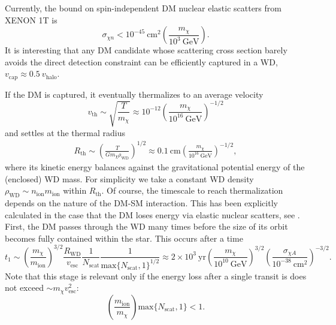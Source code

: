 \documentclass[preprintnumbers,amsmath,amssymb,prd,superscriptaddress]{revtex4}
\newcommand{\GeV}{\text{GeV}}
\newcommand{\cm}{\text{cm}}
\def\r{\right)}
\def\l{\left(}
\begin{document}
Currently, the bound on spin-independent DM nuclear elastic scatters from XENON 1T is
\begin{equation}
\label{eq:xenon}
\sigma_{\chi n} < 10^{-45} ~\text{cm}^2 \l \frac{m_\chi}{10^3 ~\GeV} \r.
\end{equation}
It is interesting that any DM candidate whose scattering cross section barely avoids the direct detection constraint can be efficiently captured in a WD, $v_\text{cap} \approx 0.5 ~v_\text{halo}$. 

If the DM is captured, it eventually thermalizes to an average velocity
\begin{equation}
v_\text{th} \sim \sqrt{\frac{T}{m_\chi}} \approx 10^{-12} \l \frac{m_\chi}{10^{16} ~\GeV}\r^{-1/2}
\end{equation}
and settles at the thermal radius
\begin{align}
R_\text{th} \sim \l \frac{T}{G m_\chi \rho_\text{WD}}\r^{1/2} \approx 0.1 ~\cm \l \frac{m_\chi}{10^{16} ~\GeV}\r^{-1/2},
\end{align}
where its kinetic energy balances against the gravitational potential energy of the (enclosed) WD mass. 
For simplicity we take a constant WD density $\rho_\text{WD} \sim n_\text{ion} m_\text{ion}$ within $R_\text{th}$.
Of course, the timescale to reach thermalization depends on the nature of the DM-SM interaction.
This has been explicitly calculated in the case that the DM loses energy via elastic nuclear scatters, see \cite{Tinyakov}. 
First, the DM passes through the WD many times before the size of its orbit becomes fully contained within the star.
This occurs after a time
\begin{equation}
t_1 \sim \l \frac{m_\chi}{m_\text{ion}} \r^{3/2} \frac{R_\text{WD}}{v_\text{esc}} \frac{1}{N_\text{scat}} \frac{1}{\text{max}\{N_\text{scat}, 1\}^{1/2}} \approx 2 \times 10^{3} ~\text{yr} \l \frac{m_\chi}{10^{10} ~\GeV} \r^{3/2} \l \frac{\sigma_{\chi A}}{10^{-38} ~\cm^2} \r^{-3/2}. 
\end{equation}
Note that this stage is relevant only if the energy loss after a single transit is does not exceed $\sim m_\chi v_\text{esc}^2$:
\begin{equation}
\l \frac{m_\text{ion}}{m_\chi} \r \text{max}\{N_\text{scat},1\} < 1. 
\end{equation}
\end{document}
